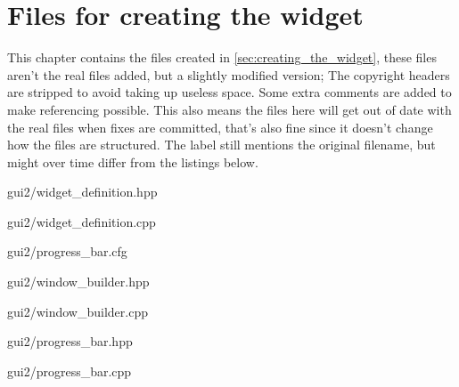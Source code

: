 \chapter{Files for creating the widget}

This chapter contains the files created in \cref{sec:creating_the_widget}, these
files aren't the real files added, but a slightly modified version; The
copyright headers are stripped to avoid taking up useless space. Some extra
comments are added to make referencing possible. This also means the files here
will get out of date with the real files when fixes are committed, that's also
fine since it doesn't change how the files are structured. The label still
mentions the original filename, but might over time differ from the listings
below.


	{gui2/widget_definition.hpp}

\pagebreak

	{gui2/widget_definition.cpp}

\pagebreak

	{gui2/progress_bar.cfg}

\pagebreak

	{gui2/window_builder.hpp}


	{gui2/window_builder.cpp}


	{gui2/progress_bar.hpp}

\pagebreak

	{gui2/progress_bar.cpp}
